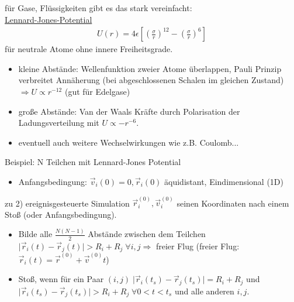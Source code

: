 \documentclass[12pt]{article}
\begin{document}
für Gase, Flüssigkeiten gibt es das stark vereinfacht:
\\
\underline{Lennard-Jones-Potential} 
\begin{align}
U(r) = 
4 \epsilon 
\left[ \left(  \frac{ \sigma }{r}  \right)^{12} - \left( \frac{\sigma }{r} \right)^6 \right]
\end{align}
für neutrale Atome ohne innere Freiheitsgrade. 
\begin{itemize}
\item kleine Abstände: Wellenfunktion zweier Atome überlappen, Pauli Prinzip verbreitet Annäherung (bei abgeschlossenen Schalen im gleichen Zustand) $\Rightarrow U \propto r^{-12}$ (gut für Edelgase) \\
\item große Abstände: Van der Waals Kräfte durch Polarisation der Ladungsverteilung mit $U \propto - r^{-6}$.
\item eventuell auch weitere Wechselwirkungen wie z.B. Coulomb...
\end{itemize}
Beispiel: N Teilchen mit Lennard-Jones Potential
\begin{itemize}
\item Anfangsbedingung: $\vec{v}_i (0)=0, \vec{r}_i (0)$ äquidistant, Eindimensional (1D) 
\end{itemize}
zu 2) ereignisgesteuerte Simulation
$\vec{r}_i^{(0)}, \vec{v}_i^{(0)}$ seinen Koordinaten nach einem Stoß (oder Anfangsbedingung).
\begin{itemize}
\item Bilde alle $\frac{N(N-1)}{2}$ Abstände zwischen dem Teilchen $ \vert \vec{r}_i (t) - \vec{r}_j (t) \vert > R_i + R_j \; \forall i,j \Rightarrow$ freier Flug (freier Flug: $\vec{r}_i (t) = \vec{r}^{(0)} + \vec{v}^{(0)} t$)
\item Stoß, wenn für ein Paar $(i,j) \; \vert \vec{r}_i (t_s) - \vec{r}_j (t_s) \vert = R_i + R_j $ und $ \vert \vec{r}_i (t_s) - \vec{r}_j (t_s) \vert > R_i + R_j \; \forall 0< t < t_s $ und alle anderen $i,j$.
\end{itemize}
\end{document}
